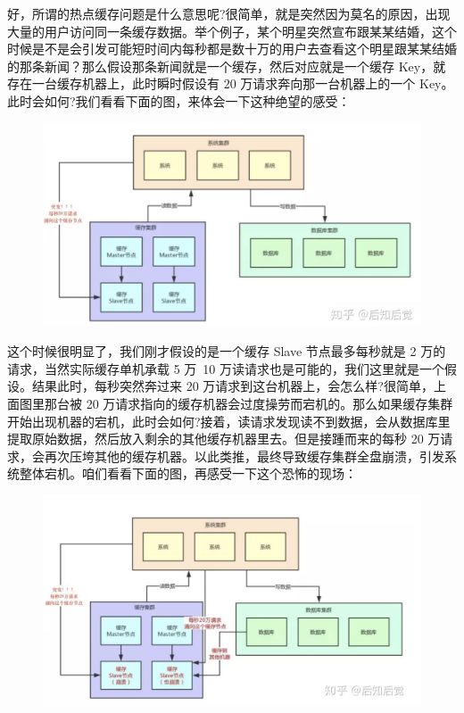 \documentclass[12pt]{article}
\begin{document}
好，所谓的热点缓存问题是什么意思呢?很简单，就是突然因为莫名的原因，出现大量的用户访问同一条缓存数据。举个例子，某个明星突然宣布跟某某结婚，这个时候是不是会引发可能短时间内每秒都是数十万的用户去查看这个明星跟某某结婚的那条新闻？那么假设那条新闻就是一个缓存，然后对应就是一个缓存 Key，就存在一台缓存机器上，此时瞬时假设有 20 万请求奔向那一台机器上的一个 Key。此时会如何?我们看看下面的图，来体会一下这种绝望的感受：
\begin{figure}[H]
    \centering
    \includegraphics[width=.8\textwidth]{fig/Cache_Infrastructure_Hot_Key_4.png}
\end{figure}

这个时候很明显了，我们刚才假设的是一个缓存 Slave 节点最多每秒就是 2 万的请求，当然实际缓存单机承载 5 万~10 万读请求也是可能的，我们这里就是一个假设。结果此时，每秒突然奔过来 20 万请求到这台机器上，会怎么样?很简单，上面图里那台被 20 万请求指向的缓存机器会过度操劳而宕机的。那么如果缓存集群开始出现机器的宕机，此时会如何?接着，读请求发现读不到数据，会从数据库里提取原始数据，然后放入剩余的其他缓存机器里去。但是接踵而来的每秒 20 万请求，会再次压垮其他的缓存机器。以此类推，最终导致缓存集群全盘崩溃，引发系统整体宕机。咱们看看下面的图，再感受一下这个恐怖的现场：
\begin{figure}[H]
    \centering
    \includegraphics[width=.8\textwidth]{fig/Cache_Infrastructure_Hot_Key_5.png}
\end{figure}
\end{document}
